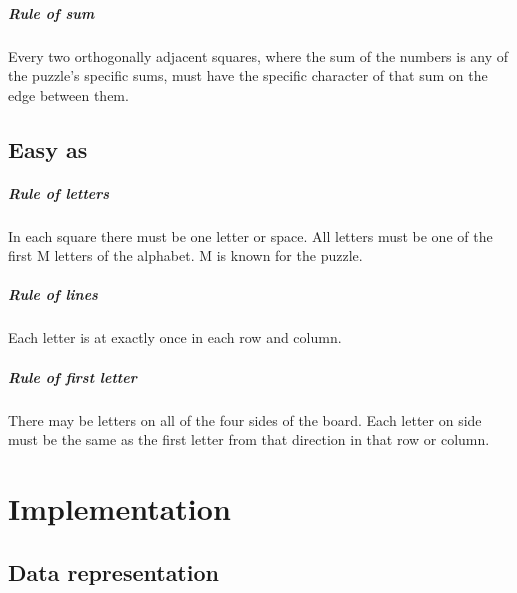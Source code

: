 \documentclass{report}
\begin{document}
\paragraph{Rule of sum}
Every two orthogonally adjacent squares, where the sum of the numbers is any of the puzzle's specific sums, must have the specific character of that sum on the edge between them.

\section{Easy as}

\paragraph{Rule of letters}
In each square there must be one letter or space. All letters must be one of the first M letters of the alphabet. M is known for the puzzle.

\paragraph{Rule of lines}
Each letter is at exactly once in each row and column.

\paragraph{Rule of first letter}
There may be letters on all of the four sides of the board. Each letter on side must be the same as the first letter from that direction in that row or column.

\chapter{Implementation}

\section{Data representation}
\end{document}
